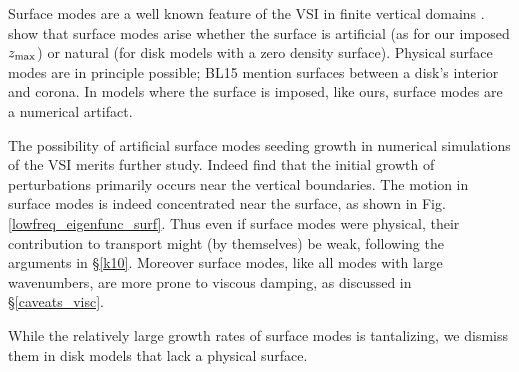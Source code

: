 Surface modes are a well known feature of the VSI in finite vertical
domains .  show
that surface modes arise whether the surface is artificial (as for our
imposed $z_\mathrm{max}$) or natural (for disk models with a zero density surface).
Physical surface modes are in principle possible; BL15 mention
surfaces between a disk's interior and corona.  In models where the
surface is imposed, like ours, surface modes are a numerical
artifact. 

The possibility of artificial surface modes seeding growth in
numerical simulations of the VSI  merits further study. Indeed
 find that the initial growth of perturbations
primarily occurs near the vertical boundaries. 
The motion in surface modes is indeed concentrated near the surface,
as shown in Fig. \ref{lowfreq_eigenfunc_surf}.   
Thus even if surface modes were physical, their contribution to
transport might (by themselves) be weak,  following the arguments in 
\S\ref{k10}.  Moreover surface modes, like all modes with large
wavenumbers, are more prone to viscous damping, as discussed in
\S\ref{caveats_visc}. 

While the relatively large growth rates of surface modes is
tantalizing, we dismiss them in disk models that lack a physical
surface.  


%
% 

